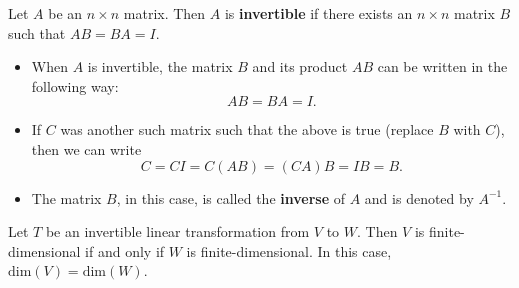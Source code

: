 \begin{definition}
   Let \( A  \) be an \( n \times n  \) matrix. Then \( A  \) is \textbf{invertible} if there exists an \( n \times n  \) matrix \( B  \) such that \( AB = BA = I  \).
\end{definition}

\begin{itemize}
    \item When \( A  \) is invertible, the matrix \( B  \) and its product \( AB  \) can be written in the following way:
        \[  AB = BA = I. \]
    \item If \( C  \) was another such matrix such that the above is true (replace \( B  \) with \( C  \)), then we can write 
        \[  C = CI = C(AB) = (CA)B = IB = B.   \]
    \item The matrix \( B  \), in this case, is called the \textbf{inverse} of \( A  \) and is denoted by \( A^{-1} \). 
\end{itemize}

\begin{lemma}
   Let \( T \) be an invertible linear transformation from \( V  \) to \( W  \). Then \( V  \) is finite-dimensional if and only if \( W  \) is finite-dimensional. In this case, \( \text{dim}(V ) = \text{dim}(W) \). 
\end{lemma}
